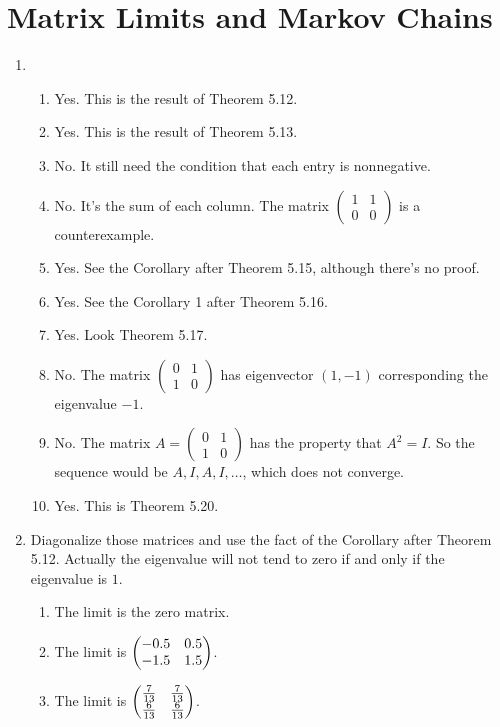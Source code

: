 \section{Matrix Limits and Markov Chains}
\begin{enumerate}
\item \begin{enumerate}
\item Yes. This is the result of Theorem 5.12.
\item Yes. This is the result of Theorem 5.13.
\item No. It still need the condition that each entry is nonnegative.
\item No. It's the sum of each column. The matrix $\begin{pmatrix}1&1\\0&0\end{pmatrix}$ is a counterexample.
\item Yes. See the Corollary after Theorem 5.15, although there's no proof.
\item Yes. See the Corollary 1 after Theorem 5.16.
\item Yes. Look Theorem 5.17.
\item No. The matrix $\begin{pmatrix}0&1\\1&0\end{pmatrix}$ has eigenvector $(1,-1)$ corresponding the eigenvalue $-1$.
\item No. The matrix $A=\begin{pmatrix}0&1\\1&0\end{pmatrix}$ has the property that $A^2=I$. So the sequence would be $A,I,A,I,\ldots $, which does not converge.
\item Yes. This is Theorem 5.20.
\end{enumerate}
\item Diagonalize those matrices and use the fact of the Corollary after Theorem 5.12. Actually the eigenvalue will not tend to zero if and only if the eigenvalue is $1$.
\begin{enumerate}
\item The limit is the zero matrix.
\item The limit is $\begin{pmatrix}-0.5 & 0.5\cr -1.5 & 1.5\end{pmatrix}$.
\item The limit is $\begin{pmatrix}\frac{7}{13} & \frac{7}{13}\cr \frac{6}{13} & \frac{6}{13}\end{pmatrix}$.

\end{enumerate}
\end{enumerate}
